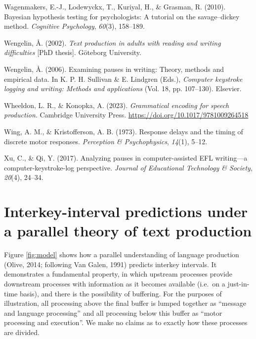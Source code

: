 \documentclass[
  man,floatsintext]{apa7}
\newlength{\cslhangindent}
\newlength{\cslentryspacingunit} %
\newenvironment{CSLReferences}[2] %
 {%
  \setlength{\parindent}{0pt}
  \ifodd #1
  \let\oldpar\par
  \def\par{\hangindent=\cslhangindent\oldpar}
  \fi
  \setlength{\parskip}{#2\cslentryspacingunit}
 }%
 {}
\begin{document}
\begin{CSLReferences}{1}{0}
\leavevmode{}%
Wagenmakers, E.-J., Lodewyckx, T., Kuriyal, H., \& Grasman, R. (2010). Bayesian hypothesis testing for psychologists: A tutorial on the savage--dickey method. \emph{Cognitive Psychology}, \emph{60}(3), 158--189.

\leavevmode{}%
Wengelin, Å. (2002). \emph{Text production in adults with reading and writing difficulties} {[}PhD thesis{]}. Göteborg University.

\leavevmode{}%
Wengelin, Å. (2006). Examining pauses in writing: {T}heory, methods and empirical data. In K. P. H. Sullivan \& E. Lindgren (Eds.), \emph{Computer keystroke logging and writing: Methods and applications} (Vol. 18, pp. 107--130). Elsevier.

\leavevmode{}%
Wheeldon, L. R., \& Konopka, A. (2023). \emph{Grammatical encoding for speech production}. Cambridge University Press. \url{https://doi.org/10.1017/9781009264518}

\leavevmode{}%
Wing, A. M., \& Kristofferson, A. B. (1973). Response delays and the timing of discrete motor responses. \emph{Perception \& Psychophysics}, \emph{14}(1), 5--12.

\leavevmode{}%
Xu, C., \& Qi, Y. (2017). Analyzing pauses in computer-assisted EFL writing---a computer-keystroke-log perspective. \emph{Journal of Educational Technology \& Society}, \emph{20}(4), 24--34.

\end{CSLReferences}

\endgroup

\newpage

\hypertarget{appendix-appendix}{%
\appendix}


\newpage

\hypertarget{interkey-interval-predictions-under-a-parallel-theory-of-text-production}{%
\section{Interkey-interval predictions under a parallel theory of text production}\label{interkey-interval-predictions-under-a-parallel-theory-of-text-production}}

Figure \ref{fig:model} shows how a parallel understanding of language production (Olive, 2014; following Van Galen, 1991) predicts interkey intervals. It demonstrates a fundamental property, in which upstream processes provide downstream processes with information as it becomes available (i.e.~on a just-in-time basis), and there is the possibility of buffering. For the purposes of illustration, all processing above the final buffer is lumped together as \enquote{message and language processing} and all processing below this buffer as \enquote{motor processing and execution}. We make no claims as to exactly how these processes are divided.
\end{document}
